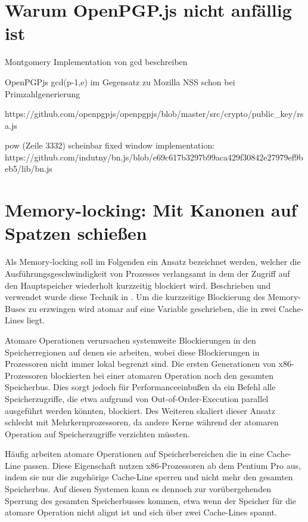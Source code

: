 
\section{Warum OpenPGP.js nicht anfällig ist}

Montgomery Implementation von gcd beschreiben

OpenPGPjs gcd(p-1,e) im Gegensatz zu Mozilla NSS schon bei Primzahlgenerierung

https://github.com/openpgpjs/openpgpjs/blob/master/src/crypto/public_key/rsa.js

pow (Zeile 3332) scheinbar fixed window implementation:\\
https://github.com/indutny/bn.js/blob/e69c617b3297b99aca429f30842e27979ef9beb5/lib/bn.js

\section{Memory-locking: Mit Kanonen auf Spatzen schießen}
\label{MemoryLocking}

Als Memory-locking soll im Folgenden ein Ansatz bezeichnet werden, welcher die Ausführungsgeschwindigkeit von Prozesses verlangsamt in dem der Zugriff auf den Hauptspeicher wiederholt kurzzeitig blockiert wird.
Beschrieben und verwendet wurde diese Technik in \cite{MemoryLockingWu, MemoryLockingRisenpart, MemoryLockingJavaAndroid}.
Um die kurzzeitige Blockierung des Memory-Buses zu erzwingen wird atomar auf eine Variable geschrieben, die in zwei Cache-Lines liegt.

Atomare Operationen verursachen systemweite Blockierungen in den Speicherregionen auf denen sie arbeiten, wobei diese Blockierungen in Prozessoren nicht immer lokal begrenzt sind.
Die ersten Generationen von x86-Prozessoren blockierten bei einer atomaren Operation noch den gesamten Speicherbus.
Dies sorgt jedoch für Performanceeinbußen da ein Befehl alle Speicherzugriffe, die etwa aufgrund von Out-of-Order-Execution parallel ausgeführt werden könnten, blockiert.
Des Weiteren skaliert dieser Ansatz schlecht mit Mehrkernprozessoren, da andere Kerne während der atomaren Operation auf Speicherzugriffe verzichten müssten.

Häufig arbeiten atomare Operationen auf Speicherbereichen die in eine Cache-Line passen. Diese Eigenschaft nutzen x86-Prozessoren ab dem Pentium Pro aus, indem sie nur die zugehörige Cache-Line sperren und nicht mehr den gesamten Speicherbus.
Auf diesen Systemen kann es dennoch zur vorübergehenden Sperrung des gesamten Speicherbusses kommen, etwa wenn der Speicher für die atomare Operation nicht alignt ist und sich über zwei Cache-Lines spannt.

